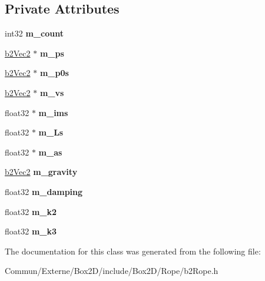 \subsection*{Private Attributes}
\begin{DoxyCompactItemize}
\item 
int32 {\bfseries m\+\_\+count}\hypertarget{classb2_rope_a25cf0ed66027fcd262714cc95589a62f}{}\label{classb2_rope_a25cf0ed66027fcd262714cc95589a62f}

\item 
\hyperlink{structb2_vec2}{b2\+Vec2} $\ast$ {\bfseries m\+\_\+ps}\hypertarget{classb2_rope_ac86bcba951cc7e5db5504e4c9af1f0a4}{}\label{classb2_rope_ac86bcba951cc7e5db5504e4c9af1f0a4}

\item 
\hyperlink{structb2_vec2}{b2\+Vec2} $\ast$ {\bfseries m\+\_\+p0s}\hypertarget{classb2_rope_a3658cb1686cb50494e50dfc38ed43290}{}\label{classb2_rope_a3658cb1686cb50494e50dfc38ed43290}

\item 
\hyperlink{structb2_vec2}{b2\+Vec2} $\ast$ {\bfseries m\+\_\+vs}\hypertarget{classb2_rope_a228257fb879daf4e5b73d2c279a37c58}{}\label{classb2_rope_a228257fb879daf4e5b73d2c279a37c58}

\item 
float32 $\ast$ {\bfseries m\+\_\+ims}\hypertarget{classb2_rope_a1854a191ae97904ba8182ba45b362d4d}{}\label{classb2_rope_a1854a191ae97904ba8182ba45b362d4d}

\item 
float32 $\ast$ {\bfseries m\+\_\+\+Ls}\hypertarget{classb2_rope_a73204bb0635c44c437c6724fb2a28b6d}{}\label{classb2_rope_a73204bb0635c44c437c6724fb2a28b6d}

\item 
float32 $\ast$ {\bfseries m\+\_\+as}\hypertarget{classb2_rope_a777771aa70d1b0717b1df3e0cae161de}{}\label{classb2_rope_a777771aa70d1b0717b1df3e0cae161de}

\item 
\hyperlink{structb2_vec2}{b2\+Vec2} {\bfseries m\+\_\+gravity}\hypertarget{classb2_rope_a982d2a7545454b62ab0a2b5eeb33b48c}{}\label{classb2_rope_a982d2a7545454b62ab0a2b5eeb33b48c}

\item 
float32 {\bfseries m\+\_\+damping}\hypertarget{classb2_rope_ac5bf18e49983f50ac6fbd3acbe954ccd}{}\label{classb2_rope_ac5bf18e49983f50ac6fbd3acbe954ccd}

\item 
float32 {\bfseries m\+\_\+k2}\hypertarget{classb2_rope_ab37ff9d1d0485be2d670b090c067ab81}{}\label{classb2_rope_ab37ff9d1d0485be2d670b090c067ab81}

\item 
float32 {\bfseries m\+\_\+k3}\hypertarget{classb2_rope_a7226de25915cfa1b7d216b46f30e2d22}{}\label{classb2_rope_a7226de25915cfa1b7d216b46f30e2d22}

\end{DoxyCompactItemize}


The documentation for this class was generated from the following file\+:\begin{DoxyCompactItemize}
\item 
Commun/\+Externe/\+Box2\+D/include/\+Box2\+D/\+Rope/b2\+Rope.\+h\end{DoxyCompactItemize}

